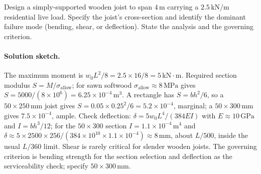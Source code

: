 \begin{exercise}
Design a simply-supported wooden joist to span $4\,\si{\meter}$
carrying a $2.5\,\text{kN}/\text{m}$ residential live load. Specify
the joist's cross-section and identify the dominant failure mode
(bending, shear, or deflection). State the analysis and the
governing criterion.

\paragraph{Solution sketch.} The maximum moment is $w_0 L^2/8 =
2.5 \times 16 / 8 = 5\,\text{kN}\cdot\text{m}$. Required section modulus
$S = M/\sigma_{\text{allow}}$; for sawn softwood
$\sigma_{\text{allow}} \approx 8\,\text{MPa}$ gives $S =
5000/(8 \times 10^{6}) = 6.25 \times 10^{-4}\,\si{\meter\cubed}$. A
rectangle has $S = bh^2/6$, so a $50 \times 250\,\si{\milli\meter}$
joist gives $S = 0.05 \times 0.25^2/6 = 5.2 \times 10^{-4}$, marginal;
a $50 \times 300\,\si{\milli\meter}$ gives $7.5 \times 10^{-4}$, ample.
Check deflection: $\delta = 5 w_0 L^4/(384 EI)$ with $E \approx
10\,\text{GPa}$ and $I = bh^3/12$; for the $50 \times 300$ section
$I = 1.1 \times 10^{-4}\,\si{\meter\tothe{4}}$ and $\delta \approx
5 \times 2500 \times 256/(384 \times 10^{10} \times 1.1 \times 10^{-4})
\approx 8\,\si{\milli\meter}$, about $L/500$, inside the usual $L/360$
limit. Shear is rarely critical for slender wooden joists. The governing
criterion is bending strength for the section selection and deflection
as the serviceability check; specify $50 \times 300\,\si{\milli\meter}$.
\end{exercise}

